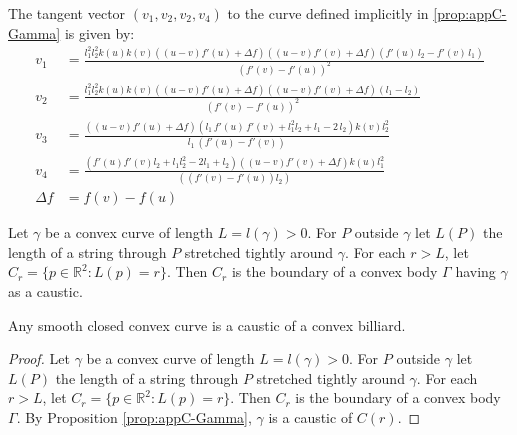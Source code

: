 \begin{remark}
The tangent vector $(v_1,v_2,v_2,v_4)$ to the curve defined implicitly in  \cref{prop:appC-Gamma} is given by:
{\small  
\begin{align*}
v_1&={\frac {l_1
^{2} l_2^{2} k \left( u \right) k \left( v \right)  \left( (u-v){f'(u)} +\Delta f \right)  \left( (u-v){f'(v)} +\Delta f \right)  \left( {f'(u)}\,{l_2}-{f'(v)}\,  
l_1 \right) }{ \left( {f'(v)}-{f'(u)} \right) ^{2}}}
\\
v_2&={\frac {l_1
^{2} l_2^{2} k \left( u \right) k \left( v \right)   \left( (u-v){f'(u)} +\Delta f \right)  \left( (u-v){f'(v)}  +\Delta f \right)  \left( {l_1}-{l_2} \right) }{
 \left(  {f'(v)}-{f'(u)} \right) ^{2}}}\\
v_3&={\frac { \left( (u-v){f'(u)} +\Delta f \right)  \left( {l_1
}\,{f'(u)}\,{f'(v)}+l_1^{2}{l_2}+{l_1}-2\,{l_2}
 \right) k(v) l_2^{2}}{{l_1}\, \left( {f'(u)}-{f'(v)
} \right) }}\\
v_4&=\frac{(f'(u) f'(v) l_2 + l_1 l_2^2 - 2 l_1 + l_2) ((u-v)f'(v)   + \Delta f) k(u) l_1^2 }{ ((f'(v) - f'(u)) l_2)}\\
 \Delta f& =f(v)-f(u)
\end{align*}
}
\end{remark}

 Let $\gamma$ be a convex curve of length $L=l(\gamma)>0$.
   For $P$  outside $\gamma$ let $ L(P)$   the length of a string through $P$ stretched tightly around $\gamma$. For each $r>L$, let $C_r=\{p\in\mathbb{R}^2: L(p)=r\}.$ Then  $C_r$ is the  boundary of a convex body $\Gamma$ having $\gamma$ as a caustic.
   
   
\begin{corollary}
  Any smooth closed convex curve is a caustic of a convex billiard.
  \label{cor:appC-caustica}
\end{corollary}

\begin{proof}
 Let $\gamma$ be a convex curve of length $L=l(\gamma)>0$.
For $P$  outside $\gamma$ let $ L(P)$   the length of a string through $P$ stretched tightly around $\gamma$. For each $r>L$, let $C_r=\{p\in\mathbb{R}^2: L(p)=r\}.$ Then  $C_r$ is the  boundary of a convex body $\Gamma$. By Proposition \cref{prop:appC-Gamma},   $\gamma$ is a caustic of $C(r)$.
\end{proof}
  
